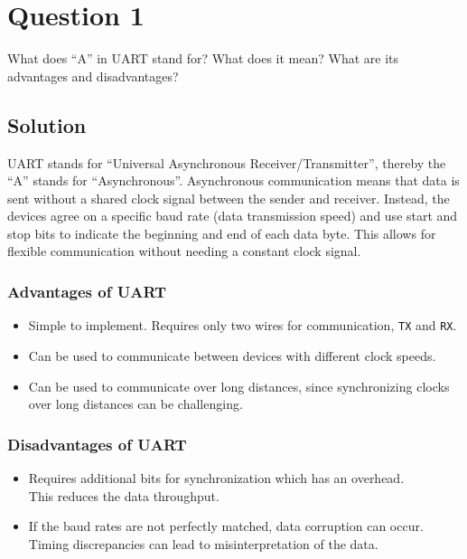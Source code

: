 \section*{Question 1}

What does ``A'' in UART stand for?
What does it mean?
What are its advantages and disadvantages?

\subsection*{Solution}

UART stands for ``Universal Asynchronous Receiver/Transmitter'', thereby the ``A'' stands for ``Asynchronous''.
Asynchronous communication means that data is sent without a shared clock signal between the sender and receiver.
Instead, the devices agree on a specific baud rate (data transmission speed) and use start and stop bits to indicate the beginning and end of each data byte.
This allows for flexible communication without needing a constant clock signal.

\subsubsection*{Advantages of UART}
\begin{itemize}[noitemsep]
    \item Simple to implement.
          Requires only two wires for communication, \texttt{TX} and \texttt{RX}.
    \item Can be used to communicate between devices with different clock speeds.
    \item Can be used to communicate over long distances, since synchronizing clocks over long distances can be challenging.
\end{itemize}

\subsubsection*{Disadvantages of UART}
\begin{itemize}[noitemsep]
    \item Requires additional bits for synchronization which has an overhead. \\
          This reduces the data throughput.
    \item If the baud rates are not perfectly matched, data corruption can occur. \\
          Timing discrepancies can lead to misinterpretation of the data.
\end{itemize}
